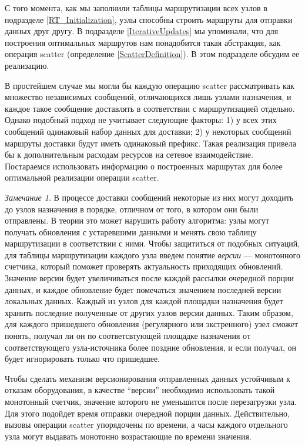 \documentclass{article}
\theoremstyle{plain}
\theoremstyle{plain}
\theoremstyle{plain}
\theoremstyle{plain}
\theoremstyle{definition}
\theoremstyle{remark}
\newtheorem{remark}{Замечание}[section]
\theoremstyle{plain}
\begin{document}
С того момента, как мы заполнили таблицы маршрутизации всех узлов в подразделе \ref{RT_Initialization}, узлы способны строить маршруты для отправки данных друг другу. В подразделе \ref{IterativeUpdates} мы упоминали, что для построения оптимальных маршрутов нам понадобится такая абстракция, как операция scatter (определение \ref{ScatterDefinition}). В этом подразделе обсудим ее реализацию.

В простейшем случае мы могли бы каждую операцию scatter рассматривать как множество независимых сообщений, отличающихся лишь узлами назначения, и каждое такое сообщение доставлять в соответствии с маршрутизацией отдельно. Однако подобный подход не учитывает следующие факторы: 1) у всех этих сообщений одинаковый набор данных для доставки; 2) у некоторых сообщений маршруты доставки будут иметь одинаковый префикс. Такая реализация привела бы к дополнительным расходам ресурсов на сетевое взаимодействие. Постараемся использовать информацию о построенных маршрутах для более оптимальной реализации операции scatter.

\begin{remark}
\label{message_versions}
    В процессе доставки сообщений некоторые из них могут доходить до узлов назначения в порядке, отличном от того, в котором они были отправлены. В теории это может нарушить работу алгоритма: узлы могут получать обновления с устаревшими данными и менять свою таблицу маршрутизации в соответствии с ними. Чтобы защититься от подобных ситуаций, для таблицы маршрутизации каждого узла введем понятие \textit{версии} --- монотонного счетчика, который поможет проверять актуальность приходящих обновлений. Значение версии будет увеличиваться после каждой рассылки очередной порции данных, и каждое обновление будет помечаться значением последней версии локальных данных. Каждый из узлов для каждой площадки назначения будет хранить последние полученные от других узлов версии данных. Таким образом, для каждого пришедшего обновления (регулярного или экстренного) узел сможет понять, получал ли он по соответсвтующей площадке назначения от соответствующего узла-источника более поздние обновления, и если получал, он будет игнорировать только что пришедшее.
    
    Чтобы сделать механизм версионирования отправленных данных устойчивым к отказам оборудования, в качестве \enquote{версии} необходимо использовать такой монотонный счетчик, значение которого не уменьшится после перезагрузки узла. Для этого подойдет время отправки очередной порции данных. Действительно, вызовы операции scatter упорядочены по времени, а часы каждого отдельного узла могут выдавать монотонно возрастающие по времени значения.
\end{remark}
\end{document}
